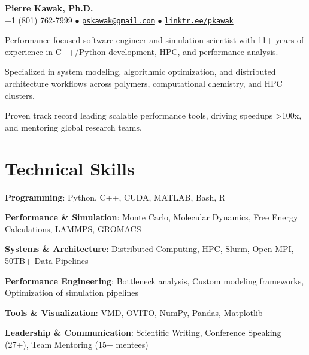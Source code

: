 \begin{center}
  {\LARGE \textbf{Pierre Kawak, Ph.D.} }\\[1ex]
  +1 (801) 762-7999 $\bullet$ \href{mailto:pskawak@gmail.com}{\tt pskawak@gmail.com} $\bullet$ \href{https://linktr.ee/pkawak}{\tt linktr.ee/pkawak}\\
\end{center}
\begin{tabitemize}
  \item Performance-focused software engineer and simulation scientist with 11+ years of experience in C++/Python development, HPC, and performance analysis.
  \item Specialized in system modeling, algorithmic optimization, and distributed architecture workflows across polymers, computational chemistry, and HPC clusters.
  \item Proven track record leading scalable performance tools, driving speedups >100x, and mentoring global research teams.
\end{tabitemize}
\vspace{-1.7\baselineskip}
\section*{Technical Skills}
\begin{tabitemize}
  \item \textbf{Programming}: Python, C++, CUDA, MATLAB, Bash, R
  \item \textbf{Performance \& Simulation}: Monte Carlo, Molecular Dynamics, Free Energy Calculations, LAMMPS, GROMACS
  \item \textbf{Systems \& Architecture}: Distributed Computing, HPC, Slurm, Open MPI, 50TB+ Data Pipelines
  \item \textbf{Performance Engineering}: Bottleneck analysis, Custom modeling frameworks, Optimization of simulation pipelines
  \item \textbf{Tools \& Visualization}: VMD, OVITO, NumPy, Pandas, Matplotlib
  \item \textbf{Leadership \& Communication}: Scientific Writing, Conference Speaking (27+), Team Mentoring (15+ mentees)  
\end{tabitemize}
\vspace{-1.7\baselineskip}
